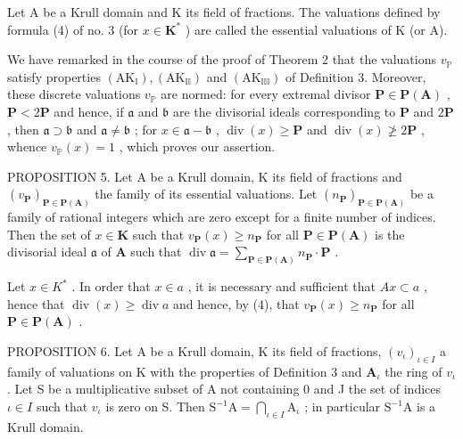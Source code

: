 Let A be a Krull domain and K its field of fractions. The valuations defined by formula (4) of no. 3 (for \(x \in \mathbf{K}^*\) ) are called the essential valuations of K (or A).

We have remarked in the course of the proof of Theorem 2 that the valuations \(v_{\mathbb{P}}\) satisfy properties \((\mathrm{AK}_{\mathbb{I}}), (\mathrm{AK}_{\mathbb{II}})\) and \((\mathrm{AK}_{\mathbb{III}})\) of Definition 3. Moreover, these discrete valuations \(v_{\mathbb{P}}\) are normed: for every extremal divisor \(\mathbf{P} \in \mathbf{P}(\mathbf{A})\) , \(\mathbf{P} < 2\mathbf{P}\) and hence, if \(\mathfrak{a}\) and \(\mathfrak{b}\) are the divisorial ideals corresponding to \(\mathbf{P}\) and \(2\mathbf{P}\) , then \(\mathfrak{a} \supset \mathfrak{b}\) and \(\mathfrak{a} \neq \mathfrak{b}\) ; for \(x \in \mathfrak{a} - \mathfrak{b}\) , \(\operatorname{div}(x) \geqslant \mathbf{P}\) and \(\operatorname{div}(x) \not\geqslant 2\mathbf{P}\) , whence \(v_{\mathbb{P}}(x) = 1\) , which proves our assertion.

PROPOSITION 5. Let A be a Krull domain, K its field of fractions and \((v_{\mathbf{P}})_{\mathbf{P} \in \mathbf{P}(\mathbf{A})}\) the family of its essential valuations. Let \((n_{\mathbf{P}})_{\mathbf{P} \in \mathbf{P}(\mathbf{A})}\) be a family of rational integers which are zero except for a finite number of indices. Then the set of \(x \in \mathbf{K}\) such that \(v_{\mathbf{P}}(x) \geqslant n_{\mathbf{P}}\) for all \(\mathbf{P} \in \mathbf{P}(\mathbf{A})\) is the divisorial ideal \(\mathfrak{a}\) of \(\mathbf{A}\) such that \(\operatorname{div} \mathfrak{a} = \sum_{\mathbf{P} \in \mathbf{P}(\mathbf{A})} n_{\mathbf{P}} \cdot \mathbf{P}\) .

Let \(x \in K^*\) . In order that \(x \in a\) , it is necessary and sufficient that \(Ax \subset a\) , hence that \(\operatorname{div}(x) \geqslant \operatorname{div} a\) and hence, by (4), that \(v_{\mathbf{P}}(x) \geqslant n_{\mathbf{P}}\) for all \(\mathbf{P} \in \mathbf{P}(\mathbf{A})\) .

PROPOSITION 6. Let A be a Krull domain, K its field of fractions, \((v_{\iota})_{\iota \in I}\) a family of valuations on K with the properties of Definition 3 and \(\mathbf{A}_{\iota}\) the ring of \(v_{\iota}\) . Let S be a multiplicative subset of A not containing 0 and J the set of indices \(\iota \in I\) such that \(v_{\iota}\) is zero on S. Then \(\mathrm{S}^{-1}\mathrm{A} = \bigcap_{\iota \in I}\mathrm{A}_{\iota}\) ; in particular \(\mathrm{S}^{-1}\mathrm{A}\) is a Krull domain.

